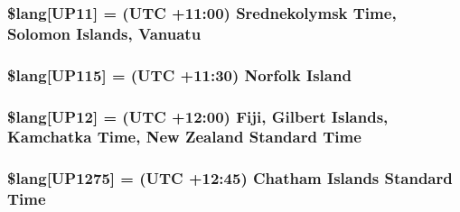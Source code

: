 \subsubsection[{\$lang}]{\setlength{\rightskip}{0pt plus 5cm}\$lang\mbox{[}\textquotesingle{}U\+P11\textquotesingle{}\mbox{]} = \textquotesingle{}(U\+T\+C +11\+:00) Srednekolymsk Time, Solomon Islands, Vanuatu\textquotesingle{}}\label{system_2language_2english_2date__lang_8php_a463ad4d63523352c17685f734b4ec7cc}
\hypertarget{system_2language_2english_2date__lang_8php_a46fa8957c8e606d1641bbcdd75cd2df0}{}
\subsubsection[{\$lang}]{\setlength{\rightskip}{0pt plus 5cm}\$lang\mbox{[}\textquotesingle{}U\+P115\textquotesingle{}\mbox{]} = \textquotesingle{}(U\+T\+C +11\+:30) Norfolk Island\textquotesingle{}}\label{system_2language_2english_2date__lang_8php_a46fa8957c8e606d1641bbcdd75cd2df0}
\hypertarget{system_2language_2english_2date__lang_8php_a18a8bb072c3fe7db99091538ce5168be}{}
\subsubsection[{\$lang}]{\setlength{\rightskip}{0pt plus 5cm}\$lang\mbox{[}\textquotesingle{}U\+P12\textquotesingle{}\mbox{]} = \textquotesingle{}(U\+T\+C +12\+:00) Fiji, Gilbert Islands, Kamchatka Time, New Zealand Standard Time\textquotesingle{}}\label{system_2language_2english_2date__lang_8php_a18a8bb072c3fe7db99091538ce5168be}
\hypertarget{system_2language_2english_2date__lang_8php_a92e3c23bd9d963bbdfd21e39521bfdc1}{}
\subsubsection[{\$lang}]{\setlength{\rightskip}{0pt plus 5cm}\$lang\mbox{[}\textquotesingle{}U\+P1275\textquotesingle{}\mbox{]} = \textquotesingle{}(U\+T\+C +12\+:45) Chatham Islands Standard Time\textquotesingle{}}\label{system_2language_2english_2date__lang_8php_a92e3c23bd9d963bbdfd21e39521bfdc1}
\hypertarget{system_2language_2english_2date__lang_8php_ac197fec09ff547ca12a7fe3ffc5908ae}{}
